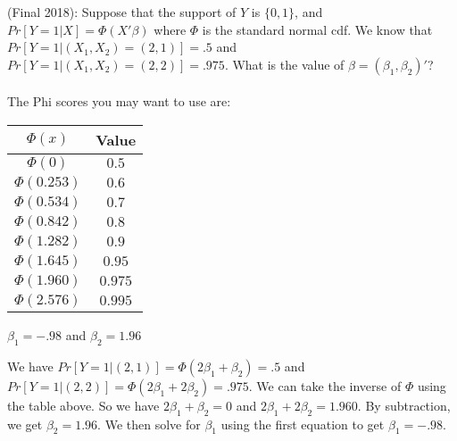 \documentclass[answers]{exam}
\begin{document}
\begin{questions}

\question (Final 2018): Suppose that the support of $Y$ is $\{0,1\}$, and $Pr[Y=1|X] = \Phi(X' \beta)$ where $\Phi$ is the standard normal cdf. We know that $Pr[Y=1|(X_1,X_2) = (2,1)] = .5$ and $Pr[Y=1|(X_1,X_2) = (2,2)] = .975$. What is the value of $\beta = (\beta_1,\beta_2)'$?\\\\
The Phi scores you may want to use are: \begin{tabular}{cc}
    \hline
    $\Phi(x)$ & Value \\ \hline
    $\Phi(0)$ & $0.5$ \\
    $\Phi(0.253)$ & $0.6$ \\
    $\Phi(0.534)$ & $0.7$ \\
    $\Phi(0.842)$ & $0.8$ \\
    $\Phi(1.282)$ & $0.9$ \\
    $\Phi(1.645)$ & $0.95$ \\
    $\Phi(1.960)$ & $0.975$ \\
    $\Phi(2.576)$ & $0.995$ \\
    \hline
    \end{tabular}
\begin{solution}
    $\beta_1 = -.98$ and $\beta_2 = 1.96$
    
    We have $Pr[Y=1|(2,1)] = \Phi(2\beta_1 + \beta_2) = .5$ and $Pr[Y=1|(2,2)] = \Phi(2\beta_1 + 2\beta_2) = .975$. We can take the inverse of $\Phi$ using the table above. So we have $2\beta_1 + \beta_2 = 0$ and $2\beta_1 + 2\beta_2 = 1.960$. By subtraction, we get $\beta_2 = 1.96$. We then solve for $\beta_1$ using the first equation to get $\beta_1 = -.98$.
    \end{solution}


\end{questions}
\end{document}

